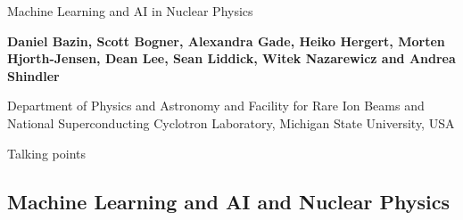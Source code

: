 \documentclass[%
oneside,                 %
final,                   %
10pt]{article}
\begin{document}

\newcommand{\exercisesection}[1]{\subsection*{#1}}






\thispagestyle{empty}

\begin{center}
{\LARGE\bf
\begin{spacing}{1.25}
Machine Learning and AI in Nuclear Physics
\end{spacing}
}
\end{center}


\begin{center}
{\bf Daniel Bazin, Scott Bogner, Alexandra Gade, Heiko Hergert, Morten Hjorth-Jensen, Dean Lee, Sean Liddick, Witek Nazarewicz and Andrea Shindler}
\end{center}

    \begin{center}
\centerline{{\small Department of Physics and Astronomy and Facility for Rare Ion Beams and National Superconducting Cyclotron Laboratory, Michigan State University, USA}}
\end{center}
    

\begin{center}
Talking points
\end{center}

\vspace{1cm}


\subsection{Machine Learning and AI and Nuclear Physics}
\end{document}
